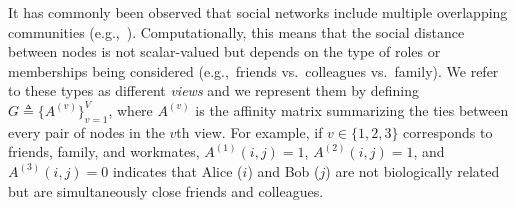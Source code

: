 It has commonly been observed that social networks include multiple overlapping communities (e.g.,~\cite{AiroldiBFX08,Kim12}). Computationally, this means that the social distance between nodes is not scalar-valued but depends on the type of roles or memberships being considered (e.g.,~friends vs.~colleagues vs.~family). We refer to these types as different \emph{views} and we represent them by defining $G\triangleq\{A^{(v)}\}_{v=1}^{V}$, where $A^{(v)}$ is the affinity matrix summarizing the ties between every pair of nodes in the $v$th view. For example, if $v\in\{1,2,3\}$ corresponds to friends, family, and workmates, $A^{(1)}(i,j)=1$, $A^{(2)}(i,j)=1$, and $A^{(3)}(i,j)=0$ indicates that Alice ($i$) and Bob ($j$) are not biologically related but are simultaneously close friends and colleagues.



